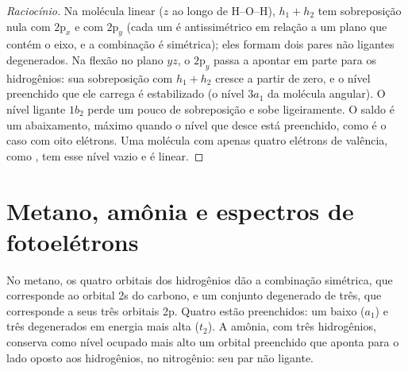 \begin{proof}[Raciocínio]
Na molécula linear ($z$ ao longo de H--O--H), $h_1 + h_2$ tem sobreposição nula
com $2\mathrm p_x$ e com $2\mathrm p_y$ (cada um é antissimétrico em relação a um
plano que contém o eixo, e a combinação é simétrica); eles formam dois pares
não ligantes degenerados. Na flexão no plano $yz$, o $2\mathrm p_y$ passa a
apontar em parte para os hidrogênios: sua sobreposição com $h_1 + h_2$ cresce a
partir de zero, e o nível preenchido que ele carrega é estabilizado (o nível
$3a_1$ da molécula angular). O nível ligante $1b_2$ perde um pouco de
sobreposição e sobe ligeiramente. O saldo é um abaixamento, máximo quando o
nível que desce está preenchido, como é o caso com oito elétrons. Uma molécula
com apenas quatro elétrons de valência, como , tem esse nível vazio e
é linear.
\end{proof}

\section{Metano, amônia e espectros de fotoelétrons}

No metano, os quatro orbitais dos hidrogênios dão a combinação simétrica, que
corresponde ao orbital 2s do carbono, e um conjunto degenerado de três, que
corresponde a seus três orbitais 2p. Quatro  estão
preenchidos: um baixo ($a_1$) e três degenerados em energia mais alta ($t_2$).
A amônia, com três hidrogênios, conserva como nível ocupado mais alto um
orbital preenchido que aponta para o lado oposto aos hidrogênios, no
nitrogênio: seu par não ligante.

